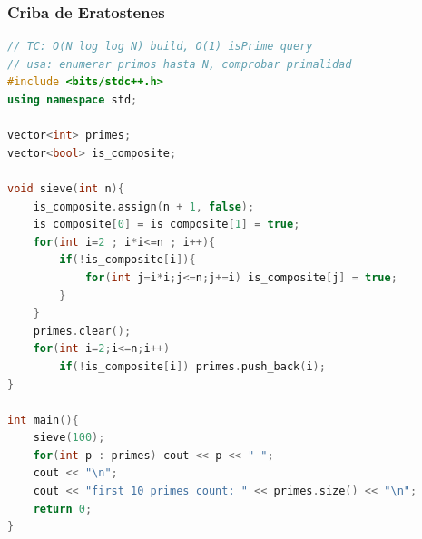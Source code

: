 \subsubsection{Criba de Eratostenes}
\begin{lstlisting}[style=mystyle, language=C++]
// TC: O(N log log N) build, O(1) isPrime query
// usa: enumerar primos hasta N, comprobar primalidad
#include <bits/stdc++.h>
using namespace std;

vector<int> primes;
vector<bool> is_composite;

void sieve(int n){
	is_composite.assign(n + 1, false);
	is_composite[0] = is_composite[1] = true;
	for(int i=2 ; i*i<=n ; i++){
		if(!is_composite[i]){
			for(int j=i*i;j<=n;j+=i) is_composite[j] = true;
		}
	}
	primes.clear();
	for(int i=2;i<=n;i++) 
		if(!is_composite[i]) primes.push_back(i);
}

int main(){
	sieve(100);
	for(int p : primes) cout << p << " ";
	cout << "\n";
	cout << "first 10 primes count: " << primes.size() << "\n";
	return 0;
}
\end{lstlisting}

